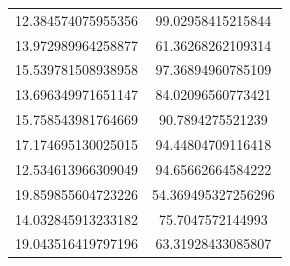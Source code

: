 \begin{table}
\begin{tabular}{cc}
12.384574075955356 & 99.02958415215844 \\
13.972989964258877 & 61.36268262109314 \\
15.539781508938958 & 97.36894960785109 \\
13.696349971651147 & 84.02096560773421 \\
15.758543981764669 & 90.7894275521239 \\
17.174695130025015 & 94.44804709116418 \\
12.534613966309049 & 94.65662664584222 \\
19.859855604723226 & 54.369495327256296 \\
14.032845913233182 & 75.7047572144993 \\
19.043516419797196 & 63.31928433085807 \\
\end{tabular}
\end{table}
